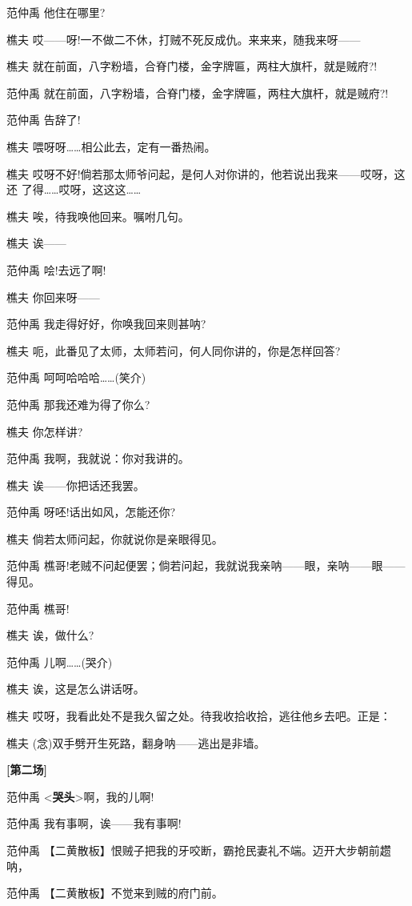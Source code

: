 范仲禹 他住在哪里?

樵夫 哎------呀!一不做二不休，打贼不死反成仇。来来来，随我来呀------

樵夫 就在前面，八字粉墙，合脊门楼，金字牌匾，两柱大旗杆，就是贼府?!

范仲禹 就在前面，八字粉墙，合脊门楼，金字牌匾，两柱大旗杆，就是贼府?!

范仲禹 告辞了!

樵夫 喂呀呀\ldots{}\ldots{}相公此去，定有一番热闹。

樵夫
哎呀不好!倘若那太师爷问起，是何人对你讲的，他若说出我来------哎呀，这还
了得\ldots{}\ldots{}哎呀，这这这\ldots{}\ldots{}

樵夫 唉，待我唤他回来。嘱咐几句。

樵夫 诶------

范仲禹 哙!去远了啊!

樵夫 你回来呀------

范仲禹 我走得好好，你唤我回来则甚呐?

樵夫 呃，此番见了太师，太师若问，何人同你讲的，你是怎样回答?

范仲禹 呵呵哈哈哈\ldots{}\ldots{}(笑介)

范仲禹 那我还难为得了你么?

樵夫 你怎样讲?

范仲禹 我啊，我就说：你对我讲的。

樵夫 诶------你把话还我罢。

范仲禹 呀呸!话出如风，怎能还你?

樵夫 倘若太师问起，你就说你是亲眼得见。

范仲禹
樵哥!老贼不问起便罢；倘若问起，我就说我亲呐------眼，亲呐------眼------得见。

范仲禹 樵哥!

樵夫 诶，做什么?

范仲禹 儿啊\ldots{}\ldots{}(哭介)

樵夫 诶，这是怎么讲话呀。

樵夫 哎呀，我看此处不是我久留之处。待我收拾收拾，逃往他乡去吧。正是：

樵夫 (念)双手劈开生死路，翻身呐------逃出是非墙。

\textbf{{[}第二场{]}}

范仲禹 \textless{}\textbf{哭头}\textgreater{}啊，我的儿啊!

范仲禹 我有事啊，诶------我有事啊!

范仲禹
【二黄散板】恨贼子把我的牙咬断，霸抢民妻礼不端。迈开大步朝前趱呐，

范仲禹 【二黄散板】不觉来到贼的府门前。

